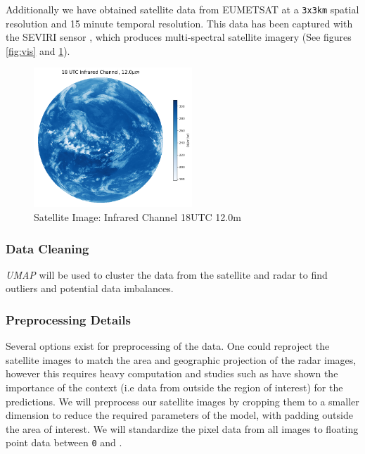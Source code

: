 \documentclass[acmtog, authorversion]{acmart}
\begin{document}
Additionally we have obtained satellite data from \textsc{EUMETSAT} at a \texttt{3x3km} spatial resolution and 15 minute temporal resolution. This data has been captured with the \textsc{SEVIRI} sensor \cite{schmid-no-date}, which produces multi-spectral satellite imagery (See figures \ref{fig:vis} and \ref{fig:infra}).

\begin{figure}
    \centering
    \includegraphics[width=225]{report/images/infrared.png}
    \caption{Satellite Image: Infrared Channel 18UTC 12.0\mu m}
    \label{fig:infra}
\end{figure}

\subsubsection{Data Cleaning} \textit{UMAP} \cite{mcinnes2020umap} will be used to cluster the data from the satellite and radar to find outliers and potential data imbalances.

\subsubsection{Preprocessing Details} Several options exist for preprocessing of the data. One could reproject the satellite images to match the area and geographic projection of the radar images, however this requires heavy computation and studies such as \cite{sønderby2020metnet} have shown the importance of the context (i.e data from outside the region of interest) for the predictions. We will preprocess our satellite images by cropping them to a smaller dimension to reduce the required parameters of the model, with padding outside the area of interest. We will standardize the pixel data from all images to floating point data between \texttt{0} and .
\end{document}
